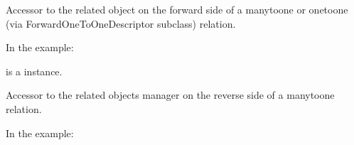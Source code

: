 \documentclass[letterpaper,10pt,spanish]{sphinxmanual}
\begin{document}
\begin{fulllineitems}
\begin{fulllineitems}

\pysigstartsignatures
{}
\pysigstopsignatures
\sphinxAtStartPar
Accessor to the related object on the forward side of a many\sphinxhyphen{}to\sphinxhyphen{}one or
one\sphinxhyphen{}to\sphinxhyphen{}one (via ForwardOneToOneDescriptor subclass) relation.

\sphinxAtStartPar
In the example:

\begin{sphinxVerbatim}[commandchars=\\\{\}]
 
       
\end{sphinxVerbatim}

\sphinxAtStartPar
{} is a  instance.

\end{fulllineitems}



\begin{fulllineitems}

\pysigstartsignatures
{}
\pysigstopsignatures
\end{fulllineitems}



\begin{fulllineitems}

\pysigstartsignatures
{}
\pysigstopsignatures
\sphinxAtStartPar
Accessor to the related objects manager on the reverse side of a
many\sphinxhyphen{}to\sphinxhyphen{}one relation.

\sphinxAtStartPar
In the example:

\begin{sphinxVerbatim}[commandchars=\\\{\}]
 
       
\end{sphinxVerbatim}


\end{fulllineitems}
\end{fulllineitems}
\end{document}
